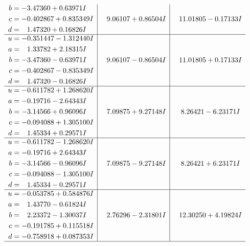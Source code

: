 \documentclass[1p]{elsarticle_modified}
\theoremstyle{definition}
\begin{document}
$$\begin{array}{c|c|c}
\begin{aligned}
b &= -3.47360 + 0.63971 I \\
c &= -0.402867 + 0.835349 I \\
d &= \phantom{-}1.47320 + 0.16826 I\end{aligned}
 & \phantom{-}9.06107 + 0.86504 I & \phantom{-}11.01805 - 0.17133 I \\ \hline\begin{aligned}
u &= -0.351447 - 1.312440 I \\
a &= \phantom{-}1.33782 + 2.18315 I \\
b &= -3.47360 - 0.63971 I \\
c &= -0.402867 - 0.835349 I \\
d &= \phantom{-}1.47320 - 0.16826 I\end{aligned}
 & \phantom{-}9.06107 - 0.86504 I & \phantom{-}11.01805 + 0.17133 I \\ \hline\begin{aligned}
u &= -0.611782 + 1.268620 I \\
a &= -0.19716 - 2.64343 I \\
b &= -3.14566 + 0.96096 I \\
c &= -0.094088 + 1.305100 I \\
d &= \phantom{-}1.45334 + 0.29571 I\end{aligned}
 & \phantom{-}7.09875 + 9.27148 I & \phantom{-}8.26421 - 6.23171 I \\ \hline\begin{aligned}
u &= -0.611782 - 1.268620 I \\
a &= -0.19716 + 2.64343 I \\
b &= -3.14566 - 0.96096 I \\
c &= -0.094088 - 1.305100 I \\
d &= \phantom{-}1.45334 - 0.29571 I\end{aligned}
 & \phantom{-}7.09875 - 9.27148 I & \phantom{-}8.26421 + 6.23171 I \\ \hline\begin{aligned}
u &= -0.053785 + 0.584876 I \\
a &= \phantom{-}1.43770 - 0.61824 I \\
b &= \phantom{-}2.23372 - 1.30037 I \\
c &= -0.191785 + 0.115518 I \\
d &= -0.758918 + 0.087353 I\end{aligned}
 & \phantom{-}2.76296 - 2.31801 I & \phantom{-}12.30250 + 4.19824 I\\
 \hline 
 \end{array}$$\newpage$$\begin{array}{c|c|c}  

\end{array}$$
\end{document}
